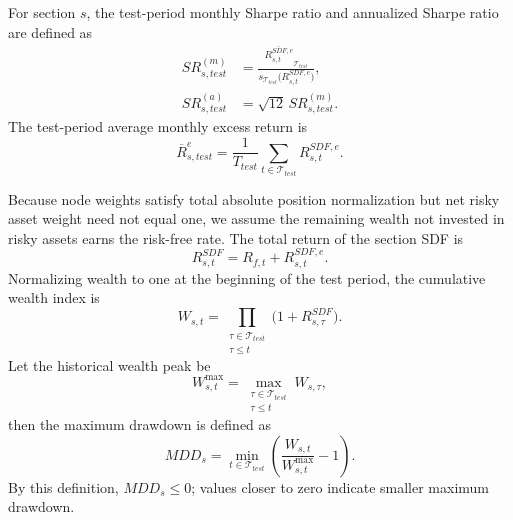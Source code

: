 \documentclass[12pt]{article}
\def\mathrm#1{#1}%
\begin{document}
For section \(s\), the test-period monthly Sharpe ratio and annualized Sharpe ratio are defined as
\begin{align}
  \mathrm{SR}_{s,\mathrm{test}}^{(m)}
  &=
  \frac{
    \overline{
      R_{s,t}^{\mathrm{SDF},e}
    }_{\mathcal T_{\mathrm{test}}}
  }{
    s_{\mathcal T_{\mathrm{test}}}
    \bigl(R_{s,t}^{\mathrm{SDF},e}\bigr)
  },
  \label{eq:test_monthly_sr}\\
  \mathrm{SR}_{s,\mathrm{test}}^{(a)}
  &=
  \sqrt{12}\,
  \mathrm{SR}_{s,\mathrm{test}}^{(m)}.
  \label{eq:test_annual_sr}
\end{align}
The test-period average monthly excess return is
\begin{equation}
  \overline R_{s,\mathrm{test}}^{e}
  =
  \frac{1}{T_{\mathrm{test}}}
  \sum_{t\in\mathcal T_{\mathrm{test}}}
  R_{s,t}^{\mathrm{SDF},e}.
  \label{eq:test_mean_return}
\end{equation}

Because node weights satisfy total absolute position normalization but net risky asset weight need not equal one, we assume the remaining wealth not invested in risky assets earns the risk-free rate. The total return of the section SDF is
\begin{equation}
  R_{s,t}^{\mathrm{SDF}}
  =
  R_{f,t}
  +R_{s,t}^{\mathrm{SDF},e}.
  \label{eq:sdf_total_return}
\end{equation}
Normalizing wealth to one at the beginning of the test period, the cumulative wealth index is
\begin{equation}
  W_{s,t}
  =
  \prod_{\substack{\tau\in\mathcal T_{\mathrm{test}}\\
                    \tau\leq t}}
  \bigl(1+R_{s,\tau}^{\mathrm{SDF}}\bigr).
  \label{eq:wealth_index}
\end{equation}
Let the historical wealth peak be
\begin{equation}
  W_{s,t}^{\max}
  =
  \max_{\substack{\tau\in\mathcal T_{\mathrm{test}}\\
                   \tau\leq t}}
  W_{s,\tau},
  \label{eq:running_wealth_peak}
\end{equation}
then the maximum drawdown is defined as
\begin{equation}
  \mathrm{MDD}_s
  =
  \min_{t\in\mathcal T_{\mathrm{test}}}
  \left(
    \frac{W_{s,t}}{W_{s,t}^{\max}}-1
  \right).
  \label{eq:max_drawdown}
\end{equation}
By this definition, \(\mathrm{MDD}_s\leq0\); values closer to zero indicate smaller maximum drawdown.
\end{document}
